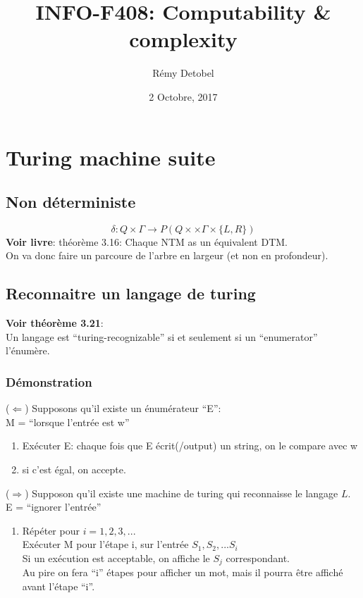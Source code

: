 \documentclass[a4paper,12pt]{article}
\title{INFO-F408: Computability \& complexity}
\date{2 Octobre, 2017}
\author{Rémy Detobel}
\begin{document}
\maketitle
\newpage

\section{Turing machine suite}
  \subsection{Non déterministe}
    $$\delta: Q \times \Gamma \rightarrow P ( Q \times \times \Gamma \times \{L, R\})$$
    \textbf{Voir livre}: théorème 3.16: Chaque NTM as un équivalent DTM.\\
    On va donc faire un parcoure de l'arbre en largeur (et non en profondeur).
  
  \subsection{Reconnaitre un langage de turing}
    \textbf{Voir théorème 3.21}:\\
    Un langage est ``turing-recognizable'' si et seulement si un ``enumerator'' l'énumère.

    \subsubsection{Démonstration}
      ($\Leftarrow$) Supposons qu'il existe un énumérateur ``E'':\\
      M = ``lorsque l'entrée est w''
      \begin{enumerate}
	\item Exécuter E: chaque fois que E écrit(/output) un string, on le compare avec w
	\item si c'est égal, on accepte.
      \end{enumerate}
    
      ($\Rightarrow$) Supposon qu'il existe une machine de turing qui reconnaisse le langage $L$.\\
      E = ``ignorer l'entrée''
      \begin{enumerate}
	\item Répéter pour $i = 1, 2, 3, ...$\\
	Exécuter M pour l'étape i, sur l'entrée $S_1, S_2, ... S_i$\\
	Si un exécution est acceptable, on affiche le $S_j$ correspondant.\\
	Au pire on fera ``i'' étapes pour afficher un mot, mais il pourra être affiché avant l'étape ``i''.
      \end{enumerate}
      
\end{document}
